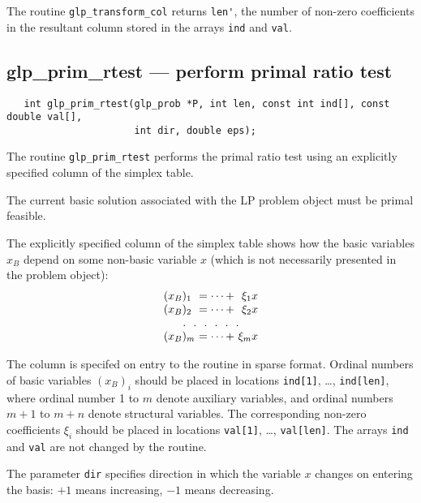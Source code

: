 \returns

The routine \verb|glp_transform_col| returns \verb|len'|, the number of
non-zero coefficients in the resultant column stored in the arrays
\verb|ind| and \verb|val|.

\newpage

\subsection{glp\_prim\_rtest --- perform primal ratio test}

\synopsis

\begin{verbatim}
   int glp_prim_rtest(glp_prob *P, int len, const int ind[], const double val[],
                      int dir, double eps);
\end{verbatim}

\description

The routine \verb|glp_prim_rtest| performs the primal ratio test using
an explicitly specified column of the simplex table.

The current basic solution associated with the LP problem object must
be primal feasible.

The explicitly specified column of the simplex table shows how the
basic variables $x_B$ depend on some non-basic variable $x$ (which is
not necessarily presented in the problem object):
$$
\begin{array}{l@{\ }c@{\ }r}
(x_B)_1&=\dots+&\xi_{1}x\\
(x_B)_2&=\dots+&\xi_{2}x\\
\multicolumn{3}{c}{.\ \ .\ \ .\ \ .\ \ .\ \ .}\\
(x_B)_m&=\dots+&\xi_{m}x\\
\end{array}
$$

The column is specifed on entry to the routine in sparse format.
Ordinal numbers of basic variables $(x_B)_i$ should be placed in
locations \verb|ind[1]|, \dots, \verb|ind[len]|, where ordinal number
1 to $m$ denote auxiliary variables, and ordinal numbers $m+1$ to $m+n$
denote structural variables. The corresponding non-zero coefficients
$\xi_i$ should be placed in locations
\verb|val[1]|, \dots, \verb|val[len]|. The arrays \verb|ind| and
\verb|val| are not changed by the routine.

The parameter \verb|dir| specifies direction in which the variable $x$
changes on entering the basis: $+1$ means increasing, $-1$ means
decreasing.

